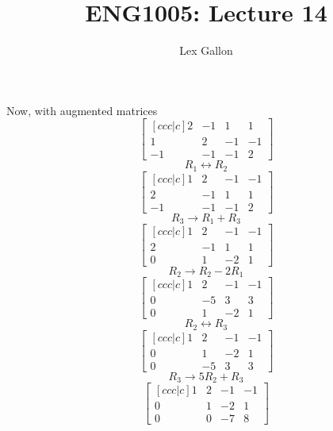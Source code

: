 \documentclass[11pt]{article}
\begin{document}
\begin{enumerate}[ (i) ]
Now, with augmented matrices
\[
\begin{bmatrix}[ccc|c]
2 & -1 & 1 & 1 \\
1 & 2 & -1 & -1 \\
-1 & -1 & -1 & 2
\end{bmatrix}
\]
\[ R_1 \leftrightarrow R_2 \]
\[
\begin{bmatrix}[ccc|c]
1 & 2 & -1 & -1 \\
2 & -1 & 1 & 1 \\
-1 & -1 & -1 & 2
\end{bmatrix}
\]
\[R_3 \rightarrow R_1 + R_3 \]
\[
\begin{bmatrix}[ccc|c]
1 & 2 & -1 & -1 \\
2 & -1 & 1 & 1 \\
0 & 1 & -2 & 1
\end{bmatrix}
\]
\[ R_2 \rightarrow R_2 - 2R_1 \]
\[
\begin{bmatrix}[ccc|c]
1 & 2 & -1 & -1 \\
0 & -5 & 3 & 3 \\
0 & 1 & -2 & 1
\end{bmatrix}
\]
\[ R_2 \leftrightarrow R_3 \]
\[
\begin{bmatrix}[ccc|c]
1 & 2 & -1 & -1 \\
0 & 1 & -2 & 1 \\
0 & -5 & 3 & 3
\end{bmatrix}
\]
\[ R_3 \rightarrow 5R_2 + R_3 \]
\[
\begin{bmatrix}[ccc|c]
1 & 2 & -1 & -1 \\
0 & 1 & -2 & 1 \\
0 & 0 & -7 & 8
\end{bmatrix}
\]

\end{enumerate}

\title{ENG1005: Lecture 14}
\author{Lex Gallon}
\maketitle

\tableofcontents
\end{document}
